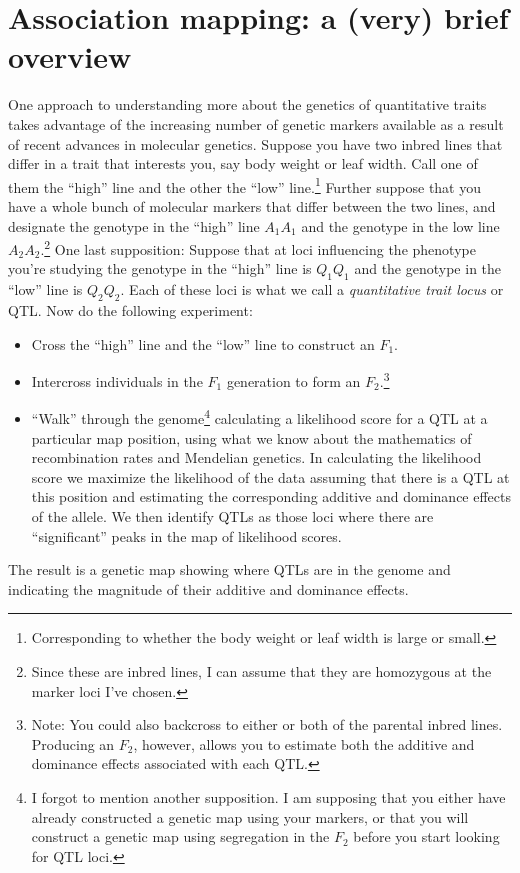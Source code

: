 \chapter{Association mapping: a (very) brief overview}

One approach to understanding more about the genetics of quantitative
traits takes advantage of the increasing number of genetic markers
available as a result of recent advances in molecular
genetics. Suppose you have two inbred lines that differ in a trait
that interests you, say body weight or leaf width. Call one of them
the ``high'' line and the other the ``low''
line.\footnote{Corresponding to whether the body weight or leaf width
  is large or small.} Further suppose that you have a whole bunch of
molecular markers that differ between the two lines, and designate the
genotype in the ``high'' line $A_1A_1$ and the genotype in the low
line $A_2A_2$.\footnote{Since these are inbred lines, I can assume
  that they are homozygous at the marker loci I've chosen.} One last
supposition: Suppose that at loci influencing the phenotype you're
studying the genotype in the ``high'' line is $Q_1Q_1$ and the
genotype in the ``low'' line is $Q_2Q_2$. Each of these loci is what
we call a {\it quantitative trait locus\/} or QTL. Now do the following experiment:

\begin{itemize}

\item Cross the ``high'' line and the ``low'' line to construct an
  $F_1$. 

\item Intercross individuals in the $F_1$ generation to form an
  $F_2$.\footnote{Note: You could also backcross to either or both of
    the parental inbred lines. Producing an $F_2$, however, allows you
    to estimate both the additive and dominance effects associated
    with each QTL.}

\item ``Walk'' through the genome\footnote{I forgot to mention another
    supposition. I am supposing that you either have already
    constructed a genetic map using your markers, or that you will
    construct a genetic map using segregation in the $F_2$ before you
    start looking for QTL loci.} calculating a likelihood score for a
  QTL at a particular map position, using what we know about the
  mathematics of recombination rates and Mendelian genetics. In
  calculating the likelihood score we maximize the likelihood of the
  data assuming that there is a QTL at this position and estimating
  the corresponding additive and dominance effects of the allele. We
  then identify QTLs as those loci where there are ``significant''
  peaks in the map of likelihood scores.

\end{itemize}
The result is a genetic map showing where QTLs are in the genome and
indicating the magnitude of their additive and dominance effects.

